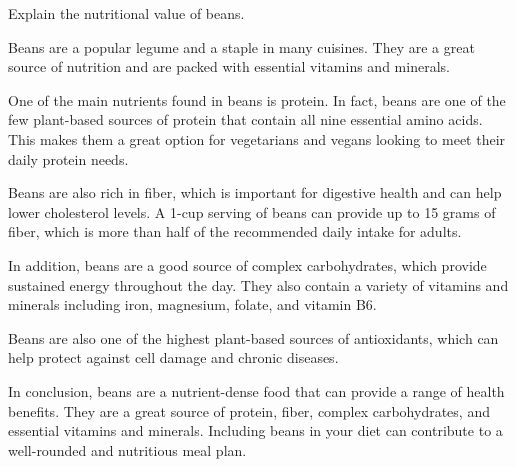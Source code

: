 \question

Explain the nutritional value of beans.
\begin{solution}
Beans are a popular legume and a staple in many cuisines. They are a great source of nutrition and are packed with essential vitamins and minerals.

One of the main nutrients found in beans is protein. In fact, beans are one of the few plant-based sources of protein that contain all nine essential amino acids. This makes them a great option for vegetarians and vegans looking to meet their daily protein needs.

Beans are also rich in fiber, which is important for digestive health and can help lower cholesterol levels. A 1-cup serving of beans can provide up to 15 grams of fiber, which is more than half of the recommended daily intake for adults.

In addition, beans are a good source of complex carbohydrates, which provide sustained energy throughout the day. They also contain a variety of vitamins and minerals including iron, magnesium, folate, and vitamin B6.

Beans are also one of the highest plant-based sources of antioxidants, which can help protect against cell damage and chronic diseases.

In conclusion, beans are a nutrient-dense food that can provide a range of health benefits. They are a great source of protein, fiber, complex carbohydrates, and essential vitamins and minerals. Including beans in your diet can contribute to a well-rounded and nutritious meal plan.
\end{solution}
